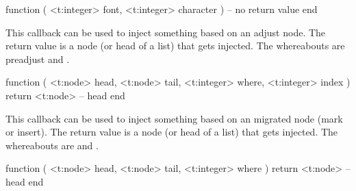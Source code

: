 \starttyping[option=LUA]
function (
    <t:integer> font,
    <t:integer> character
)
    -- no return value
end
\stoptyping

\stopsubsection

\startsubsection[title=tail_append]





\stopsubsection

\startsubsection[title=append_adjust]

This callback can be used to inject something based on an adjust node. The return
value is a node (or head of a list) that gets injected. The whereabouts are \typ
{preadjust} and .

\starttyping[option=LUA]
function (
    <t:node>    head,
    <t:node>    tail,
    <t:integer> where,
    <t:integer> index
)
    return <t:node> -- head
end
\stoptyping

\stopsubsection

\startsubsection[title=append_migrate]

This callback can be used to inject something based on an migrated node (mark or
insert). The return value is a node (or head of a list) that gets injected. The
whereabouts are  and .

\starttyping[option=LUA]
function (
    <t:node>    head,
    <t:node>    tail,
    <t:integer> where
)
    return <t:node> -- head
end
\stoptyping

\stopsubsection

\startsubsection[title=handle_uinsert]

